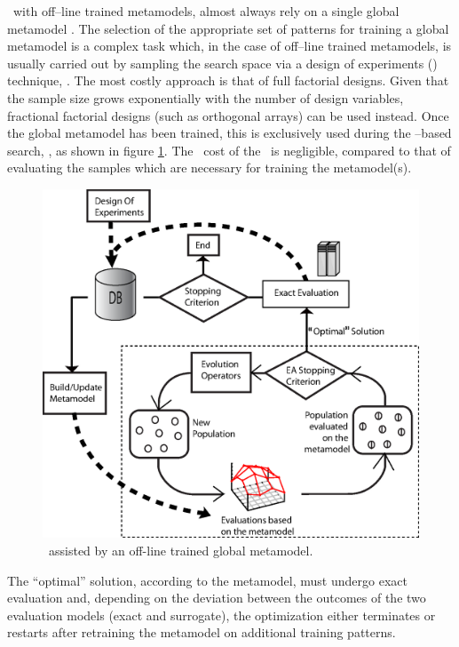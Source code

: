 \documentclass{vki_ls}
\begin{document}
\MAEAs\ with off--line trained metamodels, almost always rely on a single global metamodel \cite{Farina2002,Jin2002}.  
The selection of the appropriate set of patterns for training a global metamodel is a complex task which, in the case of off--line trained metamodels, is usually carried out by sampling the search space via a design of experiments (\DoE) technique, \cite{Mont2005}. 
The most costly approach is that of full factorial designs.
Given that the sample size grows exponentially with the number of design variables, fractional factorial designs (such as orthogonal arrays) can be used instead.
Once the global metamodel has been trained, this is exclusively used during the \EA--based search, \cite{Papad1998, Green1999, kn:Bull1999, Pier1999, Nak2004, Buch2005, LTT_3_048}, as shown in figure \ref{f:off-line-closed}. 
The \CPU\ cost of the \EA\ is negligible, compared to that of evaluating the samples which are necessary for training the metamodel(s).
%
\begin{figure}
    \centering
    \includegraphics[scale=0.6]{off-line-closed}
    \caption{\EAs\ assisted by an off-line trained global metamodel.}
    \label{f:off-line-closed}
\end{figure}
%
The ``optimal'' solution, according to the metamodel, must undergo exact evaluation and, depending on the deviation between the outcomes of the two evaluation models (exact and surrogate), the optimization either terminates or restarts after retraining the metamodel on additional training patterns.
\end{document}
